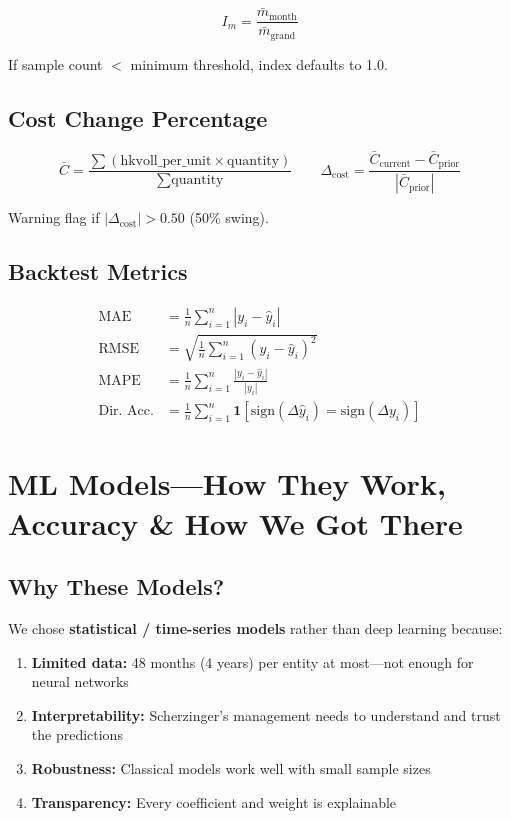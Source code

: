 \documentclass[11pt,a4paper]{article}
\begin{document}
\[
I_m = \frac{\bar{m}_{\text{month}}}{\bar{m}_{\text{grand}}}
\]

If sample count $<$ minimum threshold, index defaults to 1.0.

\subsection{Cost Change Percentage}

\[
\bar{C} = \frac{\sum (\text{hkvoll\_per\_unit} \times \text{quantity})}{\sum \text{quantity}}
\qquad
\Delta_{\text{cost}} = \frac{\bar{C}_{\text{current}} - \bar{C}_{\text{prior}}}{|\bar{C}_{\text{prior}}|}
\]

Warning flag if $|\Delta_{\text{cost}}| > 0.50$ (50\% swing).

\subsection{Backtest Metrics}

\begin{align}
\text{MAE}  &= \frac{1}{n}\sum_{i=1}^{n} |y_i - \hat{y}_i| \\
\text{RMSE} &= \sqrt{\frac{1}{n}\sum_{i=1}^{n} (y_i - \hat{y}_i)^2} \\
\text{MAPE} &= \frac{1}{n}\sum_{i=1}^{n} \frac{|y_i - \hat{y}_i|}{|y_i|} \\
\text{Dir.\ Acc.} &= \frac{1}{n}\sum_{i=1}^{n} \mathbf{1}\!\left[\text{sign}(\Delta \hat{y}_i) = \text{sign}(\Delta y_i)\right]
\end{align}

\section{ML Models---How They Work, Accuracy \& How We Got There}

\subsection{Why These Models?}

We chose \textbf{statistical / time-series models} rather than deep learning because:
\begin{enumerate}[nosep]
  \item \textbf{Limited data:} 48 months (4 years) per entity at most---not enough for neural networks
  \item \textbf{Interpretability:} Scherzinger's management needs to understand and trust the predictions
  \item \textbf{Robustness:} Classical models work well with small sample sizes
  \item \textbf{Transparency:} Every coefficient and weight is explainable
\end{enumerate}
\end{document}
